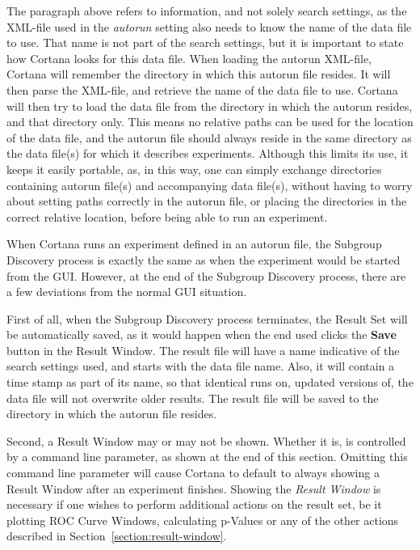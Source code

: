 \documentclass{article}
\begin{document}
The paragraph above refers to information, and not solely search settings, as the XML-file used in the \emph{autorun} setting also needs to know the name of the data file to use.
That name is not part of the search settings, but it is important to state how Cortana looks for this data file.
When loading the autorun XML-file, Cortana will remember the directory in which this autorun file resides.
It will then parse the XML-file, and retrieve the name of the data file to use.
Cortana will then try to load the data file from the directory in which the autorun resides, and that directory only.
This means no relative paths can be used for the location of the data file, and the autorun file should always reside in the same directory as the data file(s) for which it describes experiments.
Although this limits its use, it keeps it easily portable, as, in this way, one can simply exchange directories containing autorun file(s) and accompanying data file(s), without having to worry about setting paths correctly in the autorun file, or placing the directories in the correct relative location, before being able to run an experiment.

When Cortana runs an experiment defined in an autorun file, the Subgroup Discovery process is exactly the same as when the experiment would be started from the GUI.
However, at the end of the Subgroup Discovery process, there are a few deviations from the normal GUI situation.

First of all, when the Subgroup Discovery process terminates, the Result Set will be automatically saved, as it would happen when the end used clicks the \textbf{Save} button in the Result Window.
The result file will have a name indicative of the search settings used, and starts with the data file name.
Also, it will contain a time stamp as part of its name, so that identical runs on, updated versions of, the data file will not overwrite older results.
The result file will be saved to the directory in which the autorun file resides.

Second, a Result Window may or may not be shown.
Whether it is, is controlled by a command line parameter, as shown at the end of this section.
Omitting this command line parameter will cause Cortana to default to always showing a Result Window after an experiment finishes.
Showing the \emph{Result Window} is necessary if one wishes to perform additional actions on the result set, be it plotting ROC Curve Windows, calculating p-Values or any of the other actions described in Section~\ref{section:result-window}.
\end{document}
